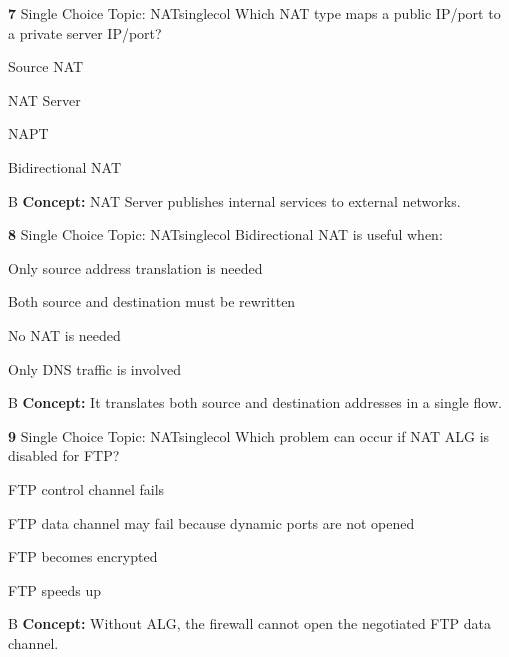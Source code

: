 \documentclass[10pt,a4paper]{article}
\begin{document}
\begin{qcard}{\color{white}\textbf{7} \hfill \small Single Choice \textbar{} Topic: NAT}{singlecol}
Which NAT type maps a public IP/port to a private server IP/port?

\begin{qoptions}
\item Source NAT
\item NAT Server
\item NAPT
\item Bidirectional NAT
\end{qoptions}
\begin{explainbox}{B}
\textbf{Concept:} NAT Server publishes internal services to external networks.
\end{explainbox}
\end{qcard}

\begin{qcard}{\color{white}\textbf{8} \hfill \small Single Choice \textbar{} Topic: NAT}{singlecol}
Bidirectional NAT is useful when:

\begin{qoptions}
\item Only source address translation is needed
\item Both source and destination must be rewritten
\item No NAT is needed
\item Only DNS traffic is involved
\end{qoptions}
\begin{explainbox}{B}
\textbf{Concept:} It translates both source and destination addresses in a single flow.
\end{explainbox}
\end{qcard}

\begin{qcard}{\color{white}\textbf{9} \hfill \small Single Choice \textbar{} Topic: NAT}{singlecol}
Which problem can occur if NAT ALG is disabled for FTP?

\begin{qoptions}
\item FTP control channel fails
\item FTP data channel may fail because dynamic ports are not opened
\item FTP becomes encrypted
\item FTP speeds up
\end{qoptions}
\begin{explainbox}{B}
\textbf{Concept:} Without ALG, the firewall cannot open the negotiated FTP data channel.
\end{explainbox}
\end{qcard}
\end{document}
